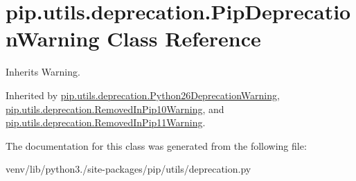 \hypertarget{classpip_1_1utils_1_1deprecation_1_1_pip_deprecation_warning}{}\section{pip.\+utils.\+deprecation.\+Pip\+Deprecation\+Warning Class Reference}
\label{classpip_1_1utils_1_1deprecation_1_1_pip_deprecation_warning}


Inherits Warning.



Inherited by \hyperlink{classpip_1_1utils_1_1deprecation_1_1_python26_deprecation_warning}{pip.\+utils.\+deprecation.\+Python26\+Deprecation\+Warning}, \hyperlink{classpip_1_1utils_1_1deprecation_1_1_removed_in_pip10_warning}{pip.\+utils.\+deprecation.\+Removed\+In\+Pip10\+Warning}, and \hyperlink{classpip_1_1utils_1_1deprecation_1_1_removed_in_pip11_warning}{pip.\+utils.\+deprecation.\+Removed\+In\+Pip11\+Warning}.



The documentation for this class was generated from the following file\+:\begin{DoxyCompactItemize}
\item 
venv/lib/python3./site-\/packages/pip/utils/deprecation.\+py\end{DoxyCompactItemize}
